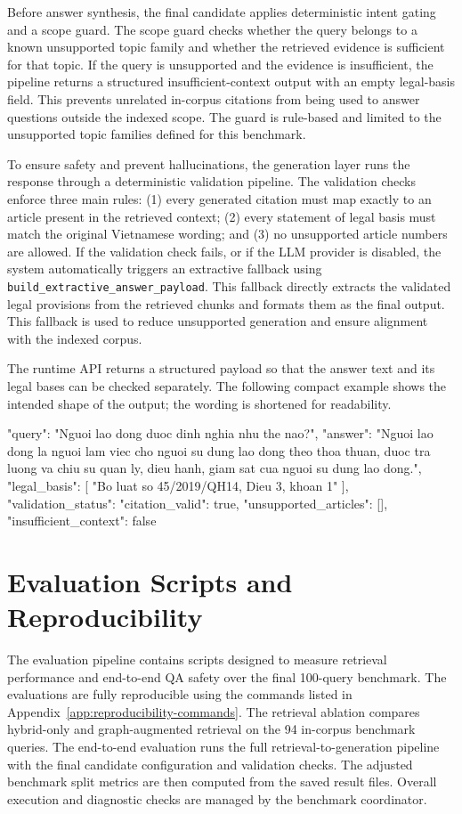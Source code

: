 Before answer synthesis, the final candidate applies deterministic intent gating and a scope guard. The scope guard checks whether the query belongs to a known unsupported topic family and whether the retrieved evidence is sufficient for that topic. If the query is unsupported and the evidence is insufficient, the pipeline returns a structured insufficient-context output with an empty legal-basis field. This prevents unrelated in-corpus citations from being used to answer questions outside the indexed scope. The guard is rule-based and limited to the unsupported topic families defined for this benchmark.

To ensure safety and prevent hallucinations, the generation layer runs the response through a deterministic validation pipeline. The validation checks enforce three main rules: (1) every generated citation must map exactly to an article present in the retrieved context; (2) every statement of legal basis must match the original Vietnamese wording; and (3) no unsupported article numbers are allowed. If the validation check fails, or if the LLM provider is disabled, the system automatically triggers an extractive fallback using \texttt{build\_extractive\_answer\_payload}. This fallback directly extracts the validated legal provisions from the retrieved chunks and formats them as the final output. This fallback is used to reduce unsupported generation and ensure alignment with the indexed corpus.

The runtime API returns a structured payload so that the answer text and its legal bases can be checked separately. The following compact example shows the intended shape of the output; the wording is shortened for readability.

\begin{ThesisCode}
{
  "query": "Nguoi lao dong duoc dinh nghia nhu the nao?",
  "answer": "Nguoi lao dong la nguoi lam viec cho nguoi su dung lao dong theo thoa thuan, duoc tra luong va chiu su quan ly, dieu hanh, giam sat cua nguoi su dung lao dong.",
  "legal_basis": [
    "Bo luat so 45/2019/QH14, Dieu 3, khoan 1"
  ],
  "validation_status": {
    "citation_valid": true,
    "unsupported_articles": [],
    "insufficient_context": false
  }
}
\end{ThesisCode}

\section{Evaluation Scripts and Reproducibility}
The evaluation pipeline contains scripts designed to measure retrieval performance and end-to-end QA safety over the final 100-query benchmark. The evaluations are fully reproducible using the commands listed in Appendix~\ref{app:reproducibility-commands}. The retrieval ablation compares hybrid-only and graph-augmented retrieval on the 94 in-corpus benchmark queries. The end-to-end evaluation runs the full retrieval-to-generation pipeline with the final candidate configuration and validation checks. The adjusted benchmark split metrics are then computed from the saved result files. Overall execution and diagnostic checks are managed by the benchmark coordinator.

